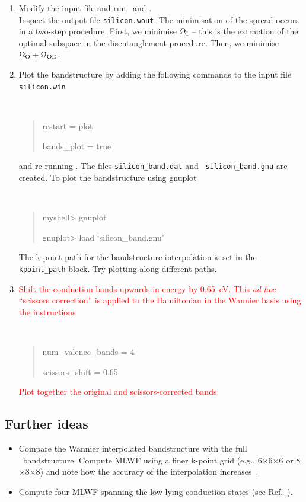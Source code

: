 \documentclass[a4paper,11pt,twoside]{article}
\def\tent#1{\textcolor{red}{#1}}     %
\begin{document}
\begin{enumerate}
\item Modify the input file and run \pwscf\ and \wannier.\\
Inspect the output file {\tt silicon.wout}. The minimisation of the
spread occurs in a two-step procedure. First, we minimise $\Omega_{\rm
  I}$ -- this is the extraction of the optimal subspace in the 
disentanglement procedure. Then, we minimise $\Omega_{\rm
  O}+\Omega_{{\rm OD}}$.

\item Plot the bandstructure by adding the following commands to the
 input file {\tt silicon.win}
{\tt
\begin{quote}
restart = plot

bands\_plot = true
\end{quote} }
and re-running \wannier. The files {\tt silicon\_band.dat} and {\tt
  silicon\_band.gnu} are created. To plot the bandstructure using
  gnuplot \smallskip
{\tt
\begin{quote}
myshell> gnuplot

gnuplot> load `silicon\_band.gnu'
\end{quote} }
The k-point path for the bandstructure interpolation is set in the {\tt
  kpoint\_path} block. Try plotting along different paths. 

\item \tent{Shift the conduction bands upwards in energy by
    0.65~eV. This {\it ad-hoc} ``scissors correction'' is applied to
    the Hamiltonian in the Wannier basis using the instructions}
%
{\tt
\begin{quote}
num\_valence\_bands = 4

scissors\_shift = 0.65
\end{quote} }
%
\tent{Plot together the original and scissors-corrected bands.}

\end{enumerate}

\subsection*{Further ideas}

\begin{itemize}
\item Compare the Wannier interpolated bandstructure with the full
  \pwscf\ bandstructure. Compute MLWF using a finer
  k-point grid (e.g., 6$\times$6$\times$6 or 8$\times$8$\times$8) and
  note how the accuracy of the interpolation increases~\cite{WanInt}.
\item Compute four MLWF spanning the low-lying conduction states (see
  Ref.~\cite{SMV}).
\end{itemize}
\end{document}
